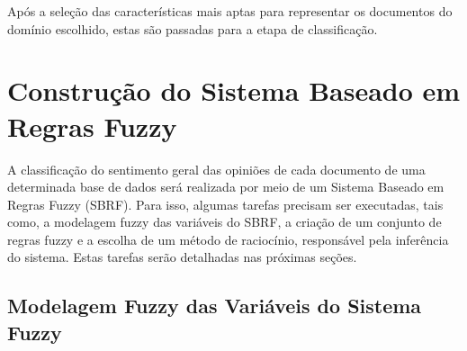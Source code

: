 \documentclass[template.tex]{subfiles}
\begin{document}

Após a seleção das características mais aptas para representar os documentos do domínio escolhido, estas são passadas para a etapa de classificação. 

\section{Construção do Sistema Baseado em Regras Fuzzy}


A classificação do sentimento geral das opiniões de cada documento de uma determinada base de dados será realizada por meio de um Sistema Baseado em Regras Fuzzy (SBRF). Para isso, algumas tarefas precisam ser executadas, tais como, a modelagem fuzzy das variáveis do SBRF, a criação de um conjunto de regras fuzzy e a escolha de um método de raciocínio, responsável pela inferência do sistema. Estas tarefas serão detalhadas nas próximas seções.

\subsection{Modelagem Fuzzy das Variáveis do Sistema Fuzzy}
\end{document}

